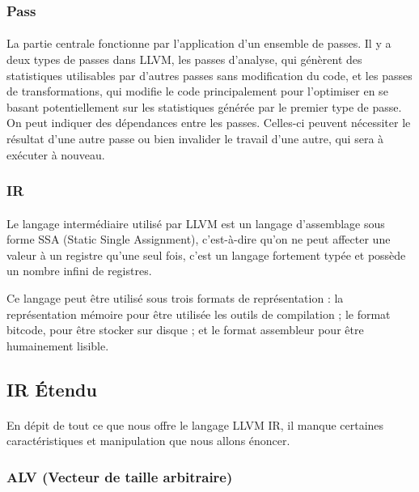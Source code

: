\subsubsection{Pass}
\paragraph{}
La partie centrale fonctionne par l'application d’un ensemble de passes. Il y a
deux types de passes dans LLVM, les passes d’analyse, qui génèrent des
statistiques utilisables par d’autres passes sans modification du code, et les
passes de transformations, qui modifie le code principalement pour l'optimiser
en se basant potentiellement sur les statistiques générée par le premier type de
passe. On peut indiquer des dépendances entre les passes. Celles-ci peuvent
nécessiter le résultat d’une autre passe ou bien invalider le travail d’une
autre, qui sera à exécuter à nouveau.

\subsubsection{IR}
\paragraph{}
Le langage intermédiaire utilisé par LLVM est un langage d'assemblage sous forme
SSA (Static Single Assignment), c'est-à-dire qu'on ne peut affecter une valeur à
un registre qu'une seul fois, c'est un langage fortement typée et possède un
nombre infini de registres.

Ce langage peut être utilisé sous trois formats de représentation : la
représentation mémoire pour être utilisée les outils de compilation ; le format
bitcode, pour être stocker sur disque ; et le format assembleur pour être
humainement lisible.

\subsection{IR Étendu}
\paragraph{}
En dépit de tout ce que nous offre le langage LLVM IR, il manque certaines
caractéristiques et manipulation que nous allons énoncer.

\subsubsection{ALV (Vecteur de taille arbitraire)}

